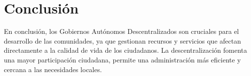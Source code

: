 \documentclass[12pt]{article}
\begin{document}
\section{Conclusión}

En conclusión, los Gobiernos Autónomos Descentralizados son cruciales para el desarrollo de las comunidades, ya que gestionan recursos y servicios que afectan directamente a la calidad de vida de los ciudadanos. La descentralización fomenta una mayor participación ciudadana, permite una administración más eficiente y cercana a las necesidades locales. \cite{pichincha2017}

\newpage



\end{document}
